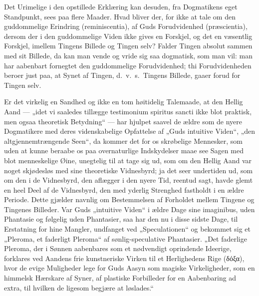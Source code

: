 \documentclass[12pt]{book}
\newcommand{\opage}[1]{\marginnote{\footnotesize\textit{[#1]}}}
\begin{document}
Det Urimelige i den opstillede Erklæring kan desuden, fra Dogmatikens eget Standpunkt, sees paa
flere Maader. Hvad bliver der, for ikke at tale om den guddommelige Erindring (reminiscentia), af
Guds Forudvidenhed (præscientia), dersom der i den guddommelige Viden ikke gives en Forskjel, og
det en væsentlig Forskjel, imellem Tingens Billede og Tingen selv? Falder Tingen absolut sammen med
sit Billede, da kan man vende og vride sig saa dogmatisk, som man vil: man har aabenbart fornegtet
den guddommelige Forudvidenhed; thi Forudvidenheden beroer just paa, at Synet af Tingen, d.\ v.\ s.\
Tingens Billede, gaaer forud for Tingen selv.

Er det virkelig en Sandhed og ikke en tom høitidelig Talemaade, at den Hellig Aand --- „idet vi
saaledes tillægge testimonium spiritus sancti ikke blot praktisk, men ogsaa theoretisk Betydning“
--- har hjulpet saavel de ældre som de
\opage{240} nyere Dogmatikere med deres videnskabelige Opfattelse af „Guds intuitive Viden“, „den
altgjennemtrængende Seen“, da kommer det for os skrøbelige Mennesker, som uden at kunne beraabe os
paa overnaturlige Indskydelser maae see Sagen med blot menneskelige Øine, unegtelig til at tage sig
ud, som om den Hellig Aand var noget skjødesløs med sine theoretiske Vidnesbyrd; ja det seer
undertiden ud, som om den i de Vidnesbyrd, den aflægger i den nyere Tid, reentud sagt, havde glemt
en heel Deel af de Vidnesbyrd, den med yderlig Strenghed fastholdt i en ældre Periode. Dette
gjælder navnlig om Bestemmelsen af Forholdet mellem Tingene og Tingenes Billeder. Var Guds
„intuitive Viden“ i ældre Dage sine imaginibus, uden Phantasie og følgelig uden Phantasier, saa har
den nu i disse sidste Dage, til Erstatning for hine Mangler, undfanget ved „Speculationen“ og
bekommet sig et „Pleroma, et faderligt Pleroma“ af sønlig-speculative Phantasier. „Det faderlige
Pleroma, der i Sønnen aabenbares som et nødvendigt oprindende Ideerige, forklares ved Aandens frie
kunstneriske Virken til et Herlighedens Rige (δόξα), hvor de evige Muligheder lege for Guds Aasyn
som magiske Virkeligheder, som en himmelsk Hærskare af Syner, af plastiske Forbilleder for en
Aabenbaring ad extra, til hvilken de ligesom begjære at løslades.“
\end{document}
